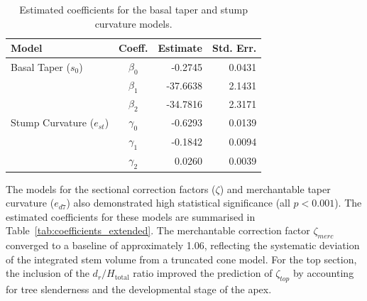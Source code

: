 \documentclass[twocolumn, bibliography=totoc]{scrartcl}
\begin{document}
\begin{table}[htbp]
  \centering
  \caption{Estimated coefficients for the basal taper and stump curvature models.}
  \label{tab:coefficients}
  \begin{tabular}{l c r r}
    \toprule
    Model & Coeff. & Estimate & Std. Err. \\
    \midrule
    Basal Taper ($s_0$)      & $\beta_0$  & -0.2745  & 0.0431 \\
                             & $\beta_1$  & -37.6638 & 2.1431 \\
                             & $\beta_2$  & -34.7816 & 2.3171 \\
    \midrule
    Stump Curvature ($e_{st}$) & $\gamma_0$ & -0.6293  & 0.0139 \\
                               & $\gamma_1$ & -0.1842  & 0.0094 \\
                               & $\gamma_2$ &  0.0260  & 0.0039 \\
    \bottomrule
  \end{tabular}
\end{table}

The models for the sectional correction factors ($\zeta$) and merchantable taper curvature ($e_{d7}$) also demonstrated high statistical significance (all $p < 0.001$). The estimated coefficients for these models are summarised in Table~\ref{tab:coefficients_extended}. The merchantable correction factor $\zeta_{merc}$ converged to a baseline of approximately 1.06, reflecting the systematic deviation of the integrated stem volume from a truncated cone model. For the top section, the inclusion of the $d_r/H_{\text{total}}$ ratio improved the prediction of $\zeta_{top}$ by accounting for tree slenderness and the developmental stage of the apex.
\end{document}
